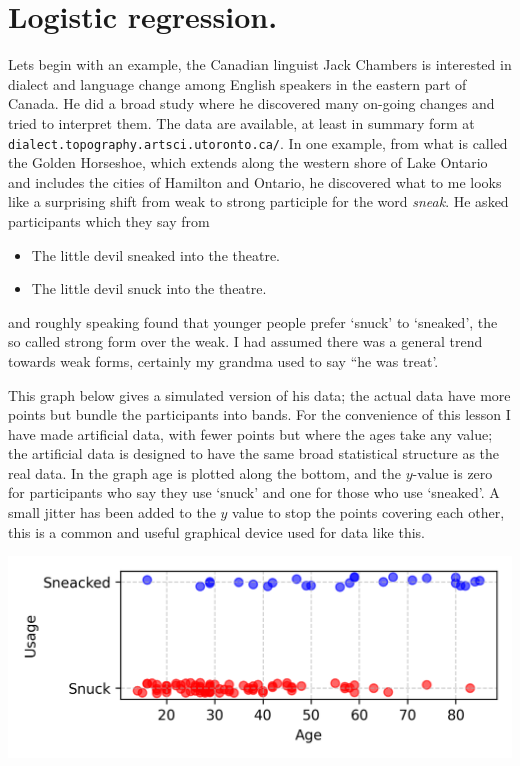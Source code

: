 \documentclass[12pt]{article}
\begin{document}
\section*{Logistic regression.} 

Lets begin with an example, the Canadian linguist Jack Chambers is
interested in dialect and language change among English speakers in
the eastern part of Canada. He did a broad study where he discovered
many on-going changes and tried to interpret them. The data are
available, at least in summary form at
\texttt{dialect.topography.artsci.utoronto.ca/}. In one example, from
what is called the Golden Horseshoe, which extends along the western
shore of Lake Ontario and includes the cities of Hamilton and Ontario,
he discovered what to me looks like a surprising shift from weak to
strong participle for the word \textsl{sneak}. He asked participants which they say from
\begin{itemize}
\item The little devil sneaked into the theatre.
\item The little devil snuck into the theatre.
\end{itemize}
and roughly speaking found that younger people prefer `snuck' to
`sneaked', the so called strong form over the weak. I had assumed
there was a general trend towards weak forms, certainly my grandma used to say ``he was treat'.

This graph below gives a simulated version of his data; the actual
data have more points but bundle the participants into bands. For the
convenience of this lesson I have made artificial data, with fewer
points but where the ages take any value; the artificial data is
designed to have the same broad statistical structure as the real
data. In the graph age is plotted along the bottom, and the $y$-value
is zero for participants who say they use `snuck' and one for those
who use `sneaked'. A small jitter has been added to the $y$ value to
stop the points covering each other, this is a common and useful graphical device used for data like this.
\begin{center}
  \includegraphics[]{02.4_sneak.png}
  \end{center}
\end{document}
